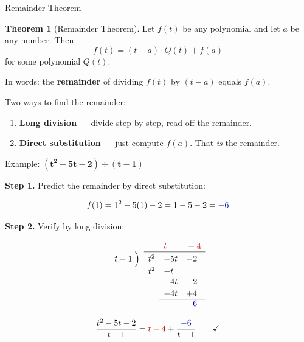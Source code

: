 \documentclass[10pt]{beamer}
\theoremstyle{definition}
\newtheorem{thm}{Theorem}[section]
\newcommand{\x}[1]{\alert{\textbf{#1}}}
\newcommand{\rd}[1]{{\color{red!70!black}#1}}
\newcommand{\bl}[1]{{\color{blue!70!black}#1}}
\begin{document}
\begin{frame}{Remainder Theorem}

\begin{thm}[Remainder Theorem]
Let $f(t)$ be any polynomial and let $a$ be any number. Then
$$f(t) = (t - a) \cdot Q(t) + f(a)$$
for some polynomial $Q(t)$.

In words: the \x{remainder} of dividing $f(t)$ by $(t - a)$ equals $f(a)$.
\end{thm}

\vfill

Two ways to find the remainder:

\vfill

\begin{enumerate}
\item \x{Long division} --- divide step by step, read off the remainder.

\item \x{Direct substitution} --- just compute $f(a)$.
      That \emph{is} the remainder.
\end{enumerate}

\vfill
\end{frame}


\begin{frame}{Example: $\boldsymbol{(t^2 - 5t - 2) \div (t - 1)}$}

\x{Step 1.} Predict the remainder by direct substitution:

$$f(1) = 1^2 - 5(1) - 2 = 1 - 5 - 2 = \bl{-6}$$

\vfill

\x{Step 2.} Verify by long division:

$$\begin{array}{rlll}
&&{\color{red!70!black} t}&{\color{red!70!black}{}-4}\\
    \cline{2-4}
    t-1 \;\Big)& t^2 & -5t  & -2 \\[2pt]
    & t^2 & -t &  \\
    \cline{2-3}
    &  & -4t & -2  \\[2pt]
    &   & -4t & +4  \\
    \cline{3-4}
    &   &  & {\color{blue!70!black}-6}  \\
\end{array}$$

\vfill

$$\frac{t^2 - 5t - 2}{t - 1} = \rd{t - 4} + \frac{\bl{-6}}{t - 1} \qquad \checkmark$$

\vfill
\end{frame}
\end{document}
